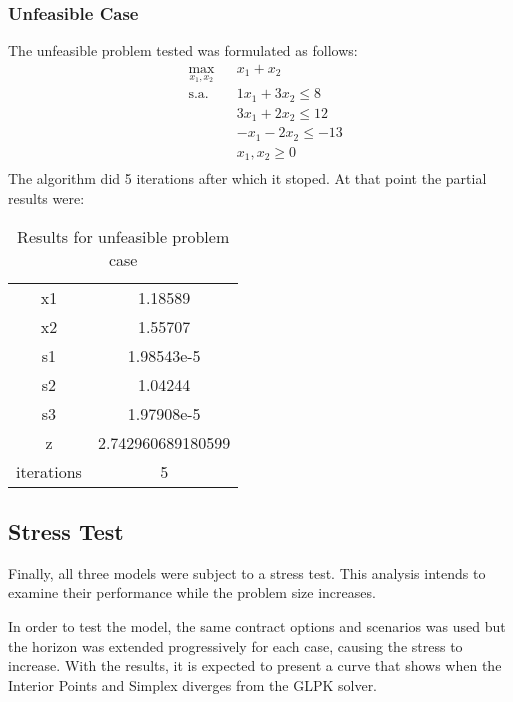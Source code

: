 \documentclass[a4paper]{IEEEtran}
\begin{document}
\subsubsection{Unfeasible Case}
The unfeasible problem tested was formulated as follows:
       \begin{equation}
        \begin{aligned}
            & \underset{x_1, x_2}{\text{max}}
            & & x_1 + x_2\\
            & \text{s.a.}
            & & 1x_1  + 3x_2 \leq 8 \\
            &&& 3x_1 + 2x_2 \leq 12 \\
            &&& -x_1 - 2x_2 \leq -13 \\
            &&& x_1, x_2 \geq 0 \\
        \end{aligned}
    \end{equation}
     The algorithm did 5 iterations after which it stoped. At that point the partial results were:\\
        \begin{table}[H]
            \centering
            \begin{tabular}{c|c}
                 {x1} & 1.18589\\
                {x2} &  1.55707\\
                {s1} & 1.98543e-5\\
                {s2} & 1.04244\\
                {s3} & 1.97908e-5\\
                {z} & 2.742960689180599\\
            iterations  & 5 \\
            \end{tabular}
            \caption{Results for unfeasible problem case}
            \label{tab:4}
        \end{table}


\subsection{Stress Test}
Finally, all three models were subject to a stress test. This analysis intends to examine their performance while the problem size increases. 

In order to test the model, the same contract options and scenarios was used but the horizon was extended progressively for each case, causing the stress to increase. With the results, it is expected to present a curve that shows when the Interior Points and Simplex diverges from the GLPK solver.
\end{document}
